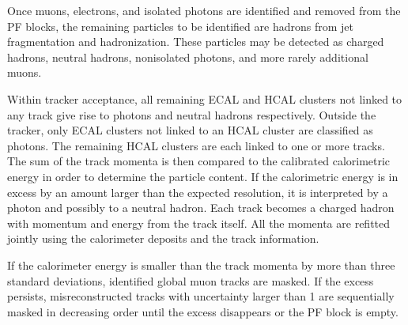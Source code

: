 Once muons, electrons, and isolated photons are identified and removed from the PF blocks,
the remaining particles to be identified are hadrons from jet fragmentation and hadronization.
These particles may be detected as charged hadrons, neutral hadrons, nonisolated photons, and more rarely additional muons.

Within tracker acceptance, all remaining ECAL and HCAL clusters not linked to any track give rise to photons and neutral hadrons respectively.
Outside the tracker, only ECAL clusters not linked to an HCAL cluster are classified as photons.
The remaining HCAL clusters are each linked to one or more tracks.
The sum of the track momenta is then compared to the calibrated calorimetric energy in order to determine the particle content.
If the calorimetric energy is in excess by an amount larger than the expected resolution,
it is interpreted by a photon and possibly to a neutral hadron.
Each track becomes a charged hadron with momentum and energy from the track itself.
All the momenta are refitted jointly using the calorimeter deposits and the track information.

If the calorimeter energy is smaller than the track momenta by more than three standard deviations,
identified global muon tracks are masked.
If the excess persists, misreconstructed tracks with \pt uncertainty larger than 1\GeV
are sequentially masked in decreasing \pt order until the excess disappears or the PF block is empty.
